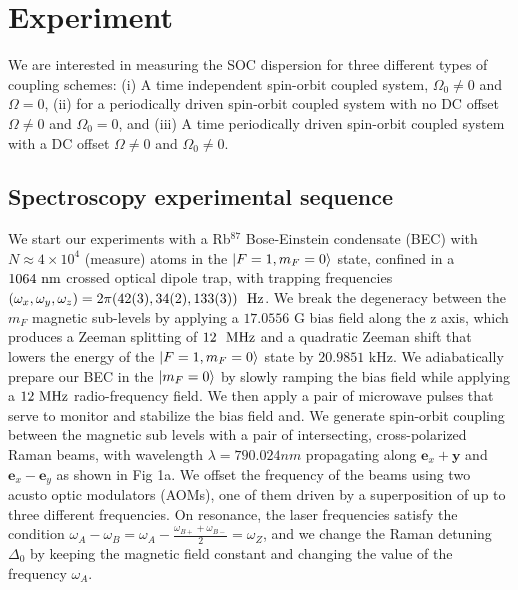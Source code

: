 \section{Experiment}

We are interested in measuring the SOC dispersion for three different types of coupling schemes: (i) A time independent spin-orbit coupled system, $\Omega_0\neq0$ and $\Omega=0$, (ii) for a periodically driven spin-orbit coupled system with no DC offset $\Omega\neq0$ and $\Omega_0=0$, and (iii) A time periodically driven spin-orbit coupled system with a DC offset $\Omega\neq0$ and $\Omega_0\neq0$. 

\subsection{Spectroscopy experimental sequence}


We start our experiments with a Rb$^{87}$ Bose-Einstein condensate \cite{lin_rapid_2009} (BEC) with $N\approx 4\times 10^4$ (measure) atoms in the $|F=1,m_F=0\rangle$ state, confined in a $1064{\ {\rm nm}}$ crossed optical dipole trap, with trapping frequencies $(\omega_x,\omega_y,\omega_z)=2\pi(42(3),34(2),133(3))\ \Hz$. We break the degeneracy between the $m_F$ magnetic sub-levels by applying a $17.0556$ G bias field along the z axis, which produces a Zeeman splitting of $12 \ {\ {\rm MHz}}$ and a quadratic Zeeman shift that lowers the energy of the $|F=1,m_F=0\rangle$ state  by $20.9851$ kHz. We adiabatically prepare our BEC in the $|m_F=0\rangle$ by slowly ramping the bias field while applying a $12{\ {\rm MHz}}$ radio-frequency field. We then apply a pair of microwave pulses that serve to monitor and stabilize the bias field and. We generate spin-orbit coupling between the magnetic sub levels with a pair of intersecting, cross-polarized Raman beams, with wavelength $\lambda=790.024 nm$ propagating along $\mathbf{e}_x+\mathbf{y}$ and $\mathbf{e}_x-\mathbf{e}_y$ as shown in Fig 1a. We offset the frequency of the beams using two acusto optic modulators (AOMs), one of them driven by a superposition of up to three different frequencies. On resonance, the laser frequencies satisfy the condition $\omega_A-\omega_B=\omega_A-\frac{\omega_{B+}+\omega_{B-}}{2}=\omega_Z$, and we change the Raman detuning $\Delta_0$ by keeping the magnetic field constant and changing the value of the frequency $\omega_A$.

